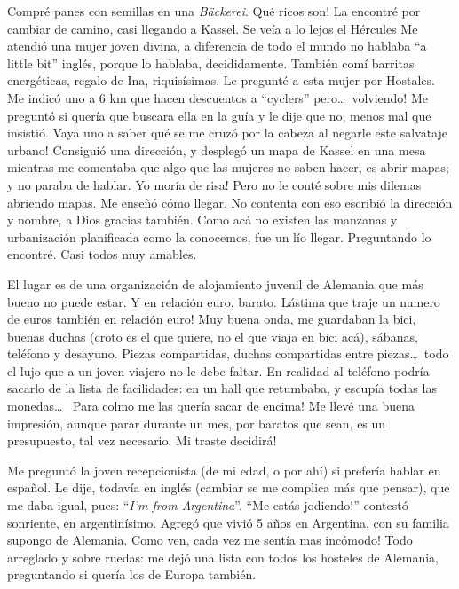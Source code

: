 Compr\'e panes con semillas en una \emph{B\"ackerei}. \textexclamdown Qu\'e
ricos son! La encontr\'e por cambiar de camino, casi llegando a Kassel. Se
ve\'ia a lo lejos el H\'ercules Me atendi\'o una mujer joven divina, a
diferencia de todo el mundo no hablaba ``a little bit'' ingl\'es, porque lo
hablaba, decididamente. Tambi\'en com\'i barritas energ\'eticas, regalo de Ina,
riquis\'isimas. Le pregunt\'e a esta mujer por Hostales. Me indic\'o uno a 6 km
que hacen descuentos a ``cyclers'' pero\ldots\ \textexclamdown volviendo! Me
pregunt\'o si quer\'ia que buscara ella en la gu\'ia y le dije que no, menos mal
que insisti\'o. \textexclamdown Vaya uno a saber qu\'e se me cruz\'o por la
cabeza al negarle este salvataje urbano! Consigui\'o una direcci\'on, y
despleg\'o un mapa de Kassel en una mesa mientras me comentaba que algo que las
mujeres no saben hacer, es abrir mapas; y no paraba de hablar. \textexclamdown
Yo mor\'ia de risa! Pero no le cont\'e sobre mis dilemas abriendo mapas. Me
ense\~n\'o c\'omo llegar. No contenta con eso escribi\'o la direcci\'on y
nombre, a Dios gracias tambi\'en. Como ac\'a no existen las manzanas y
urbanizaci\'on planificada como la conocemos, fue un l\'io llegar. Preguntando
lo encontr\'e. Casi todos muy amables.

El lugar es de una organizaci\'on de alojamiento juvenil de Alemania que m\'as
bueno no puede estar. Y en relaci\'on euro, barato. \textexclamdown L\'astima
que traje un numero de euros tambi\'en en relaci\'on euro! Muy buena onda, me
guardaban la bici, buenas duchas (croto es el que quiere, no el que viaja en
bici ac\'a), s\'abanas, tel\'efono y desayuno. Piezas compartidas, duchas
compartidas entre piezas\ldots\ todo el lujo que a un joven viajero no le debe
faltar. En realidad al tel\'efono podr\'ia sacarlo de la lista de facilidades:
en un hall que retumbaba, y escup\'ia todas las monedas\ldots\ \textexclamdown
Para colmo me las quer\'ia sacar de encima! Me llev\'e una buena impresi\'on,
aunque parar durante un mes, por baratos que sean, es un presupuesto, tal vez
necesario. \textexclamdown Mi traste decidir\'a!

Me pregunt\'o la joven recepcionista (de mi edad, o por ah\'i) si prefer\'ia
hablar en espa\~nol. Le dije, todav\'ia en ingl\'es (cambiar se me complica
m\'as que pensar), que me daba igual, pues: ``\emph{I'm from Argentina}''.
``\textexclamdown Me est\'as jodiendo!'' contest\'o sonriente, en
argentin\'isimo. Agreg\'o que vivi\'o 5 a\~nos en Argentina, con su familia
supongo de Alemania. \textexclamdown Como ven, cada vez me sent\'ia mas
inc\'omodo! Todo arreglado y sobre ruedas: me dej\'o una lista con todos los
hosteles de Alemania, preguntando si quer\'ia los de Europa tambi\'en.

